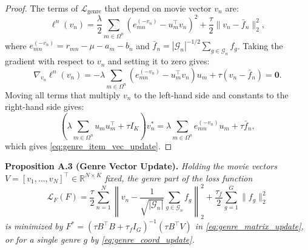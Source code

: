 \documentclass{article}
\theoremstyle{plain}
\theoremstyle{definition}
\begin{document}
\begin{proof}
The terms of $\mathcal{L}_{\text{genre}}$ that depend on movie vector $v_n$ are:
\begin{equation}
\ell^n(v_n) = \frac{\lambda}{2} \sum_{m \in \Omega^n} \left( e_{mn}^{(-v_n)} - u_m^\top v_n \right)^2 + \frac{\tau}{2} \|v_n - \bar{f}_n\|_2^2,
\end{equation}
where $e_{mn}^{(-v_n)} = r_{mn} - \mu - a_m - b_n$ and $\bar{f}_n = |\mathcal{G}_n|^{-1/2} \sum_{g \in \mathcal{G}_n} f_g$. Taking the gradient with respect to $v_n$ and setting it to zero gives:
\begin{equation}
\nabla_{v_n} \ell^n(v_n) = -\lambda \sum_{m \in \Omega^n} \left( e_{mn}^{(-v_n)} - u_m^\top v_n \right) u_m + \tau (v_n - \bar{f}_n) = \mathbf{0}.
\end{equation}
Moving all terms that multiply $v_n$ to the left-hand side and constants to the right-hand side gives:
\begin{equation}
\left( \lambda \sum_{m \in \Omega^n} u_m u_m^\top + \tau I_K \right) v_n^* = \lambda \sum_{m \in \Omega^n} e_{mn}^{(-v_n)} u_m + \tau \bar{f}_n,
\end{equation}
which gives \cref{eq:genre_item_vec_update}.
\end{proof}

\textbf{Proposition A.3 (Genre Vector Update).}
\emph{Holding the movie vectors $V = [v_1, \dots, v_N]^\top \in \mathbb{R}^{N \times K}$ fixed, the genre part of the loss function}
\begin{equation}
\mathcal{L}_F(F) = \frac{\tau}{2} \sum_{n=1}^N \left\| v_n - \frac{1}{\sqrt{|\mathcal{G}_n|}} \sum_{g \in \mathcal{G}_n} f_g \right\|_2^2 + \frac{\tau_f}{2} \sum_{g=1}^G \|f_g\|_2^2
\end{equation}
\emph{is minimized by $F^* = (\tau B^\top B + \tau_f I_G)^{-1} (\tau B^\top V)$ in \cref{eq:genre_matrix_update}, or for a single genre $g$ by \cref{eq:genre_coord_update}.}
\end{document}
